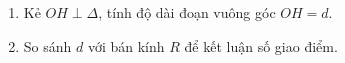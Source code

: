 \begin{enumerate}
\item Kẻ $OH \perp \Delta$, tính độ dài đoạn vuông góc $OH = d$.
\item So sánh $d$ với bán kính $R$ để kết luận số giao điểm.
\end{enumerate}
